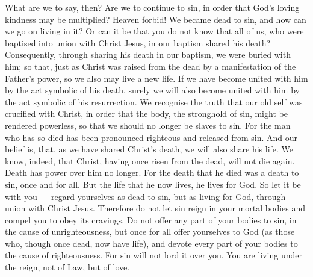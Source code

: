  What are we to say, then? Are we to continue to sin, in
order that God's loving kindness may be multiplied?  Heaven
forbid! We became dead to sin, and how can we go on living in it?
 Or can it be that you do not know that all of us, who were
baptised into union with Christ Jesus, in our baptism shared his death?
 Consequently, through sharing his death in our baptism, we
were buried with him; so that, just as Christ was raised from the dead
by a manifestation of the Father's power, so we also may live a new
life.  If we have become united with him by the act symbolic
of his death, surely we will also become united with him by the act
symbolic of his resurrection.  We recognise the truth that
our old self was crucified with Christ, in order that the body, the
stronghold of sin, might be rendered powerless, so that we should no
longer be slaves to sin.  For the man who has so died has
been pronounced righteous and released from sin.  And our
belief is, that, as we have shared Christ's death, we will also share
his life.  We know, indeed, that Christ, having once risen
from the dead, will not die again. Death has power over him no longer.
 For the death that he died was a death to sin, once and
for all. But the life that he now lives, he lives for God. 
So let it be with you --- regard yourselves as dead to sin, but as
living for God, through union with Christ Jesus.  Therefore
do not let sin reign in your mortal bodies and compel you to obey its
cravings.  Do not offer any part of your bodies to sin, in
the cause of unrighteousness, but once for all offer yourselves to God
(as those who, though once dead, now have life), and devote every part
of your bodies to the cause of righteousness.  For sin will
not lord it over you. You are living under the reign, not of Law, but of
love.

